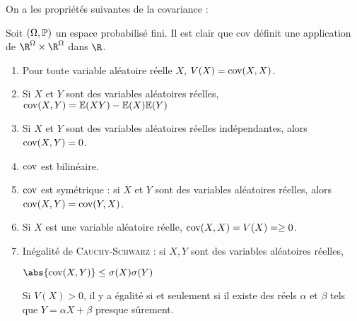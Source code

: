 \documentclass[12pt,a4paper]{report}
\begin{document}
On a les propriétés suivantes de la covariance : 
\begin{proposition}{}{}
Soit $(\Omega, \mathbb{P})$ un espace probabilisé fini. Il est clair que cov définit une application de $\R^\Omega \times \R^\Omega$ dans $\R$.
\begin{enumerate}
\item Pour toute variable aléatoire réelle $X$, $V(X) = \text{cov}(X,X)$.
\item Si $X$ et $Y$ sont des variables aléatoires réelles, $\text{cov}(X,Y) = \mathbb{E}(XY) - \mathbb{E}(X)\mathbb{E}(Y)$
\item Si $X$ et $Y$ sont des variables aléatoires réelles indépendantes, alors $\text{cov}(X,Y) = 0$.
\item $\text{cov}$ est bilinéaire.
\item $\text{cov}$ est symétrique : si $X$ et $Y$ sont des variables aléatoires réelles, alors $\text{cov}(X,Y) = \text{cov}(Y,X)$.
\item Si $X$ est une variable aléatoire réelle, $\text{cov}(X,X) = V(X) = \ge 0$.
\item Inégalité de \textsc{Cauchy-Schwarz} : si $X,Y$ sont des variables aléatoires réelles, 
\begin{center}
$\abs{\cov(X,Y)} \le \sigma(X) \sigma(Y)$
\end{center}
Si $V(X) > 0$, il y a égalité si et seulement si il existe des réels $\alpha$ et $\beta$ tels que $Y = \alpha X + \beta$ presque sûrement.
\end{enumerate}
\end{proposition}
\end{document}
